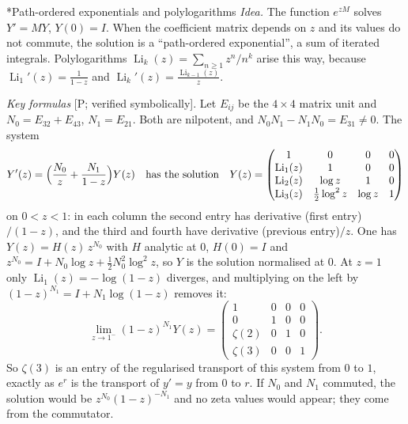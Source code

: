\documentclass[11pt,a4paper]{article}
\makeatletter
\newcommand{\Li}{\operatorname{Li}}
\newcommand{\st}[1]{\textsf{[#1]}}
\theoremstyle{definition}
\renewcommand\subsection{\@startsection{subsection}{2}{\z@}{-1.6ex plus -.5ex minus -.2ex}{.7ex plus .2ex}{\normalfont\normalsize\bfseries}}
\makeatother
\begin{document}
\subsection*{Path-ordered exponentials and polylogarithms}
\emph{Idea.} The function $e^{zM}$ solves $Y'=MY$, $Y(0)=I$. When the coefficient matrix depends on
$z$ and its values do not commute, the solution is a ``path-ordered exponential'', a sum of iterated
integrals. Polylogarithms $\Li_k(z)=\sum_{n\ge1}z^n/n^k$ arise this way, because
$\Li_1'(z)=\frac1{1-z}$ and $\Li_k'(z)=\frac{\Li_{k-1}(z)}z$.

\emph{Key formulas} \st{P; verified symbolically}. Let $E_{ij}$ be the $4\times4$ matrix unit and
$N_0=E_{32}+E_{43}$, $N_1=E_{21}$. Both are nilpotent, and $N_0N_1-N_1N_0=E_{31}\ne0$. The system
\[
Y'(z)=\Bigl(\frac{N_0}z+\frac{N_1}{1-z}\Bigr)Y(z)
\quad\text{has the solution}\quad
Y(z)=\begin{pmatrix}1&0&0&0\\ \Li_1(z)&1&0&0\\ \Li_2(z)&\log z&1&0\\
\Li_3(z)&\frac12\log^2z&\log z&1\end{pmatrix}
\]
on $0<z<1$: in each column the second entry has derivative (first entry)$/(1-z)$, and the third and
fourth have derivative (previous entry)$/z$. One has $Y(z)=H(z)\,z^{N_0}$ with $H$ analytic at $0$,
$H(0)=I$ and $z^{N_0}=I+N_0\log z+\frac12N_0^2\log^2z$, so $Y$ is the solution normalised at $0$. At
$z=1$ only $\Li_1(z)=-\log(1-z)$ diverges, and multiplying on the left by
$(1-z)^{N_1}=I+N_1\log(1-z)$ removes it:
\[
\lim_{z\to1^-}(1-z)^{N_1}Y(z)=
\begin{pmatrix}1&0&0&0\\0&1&0&0\\ \zeta(2)&0&1&0\\ \zeta(3)&0&0&1\end{pmatrix}.
\]
So $\zeta(3)$ is an entry of the regularised transport of this system from $0$ to $1$, exactly as
$e^r$ is the transport of $y'=y$ from $0$ to $r$. If $N_0$ and $N_1$ commuted, the solution would be
$z^{N_0}(1-z)^{-N_1}$ and no zeta values would appear; they come from the commutator.
\end{document}
